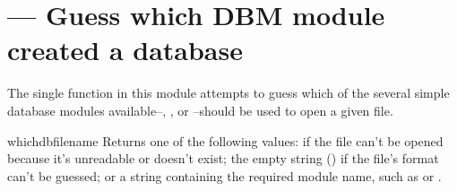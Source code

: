 \section{ ---
         Guess which DBM module created a database}



The single function in this module attempts to guess which of the
several simple database modules available--,
, or --should be used to open a
given file.

\begin{funcdesc}{whichdb}{filename}
Returns one of the following values:  if the file can't be
opened because it's unreadable or doesn't exist; the empty string
() if the file's format can't be guessed; or a string
containing the required module name, such as  or
.
\end{funcdesc}

